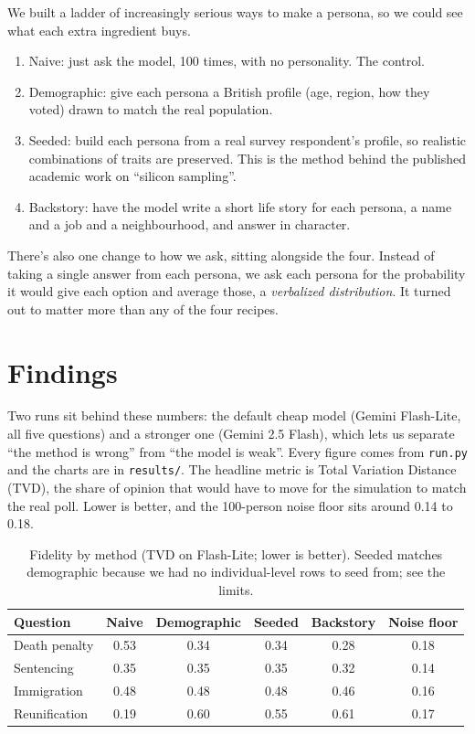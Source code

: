 \documentclass[11pt]{article}
\begin{document}
We built a ladder of increasingly serious ways to make a persona, so we could see
what each extra ingredient buys.
\begin{enumerate}
  \item Naive: just ask the model, 100 times, with no personality. The control.
  \item Demographic: give each persona a British profile (age, region, how they voted) drawn to match the real population.
  \item Seeded: build each persona from a real survey respondent's profile, so realistic combinations of traits are preserved. This is the method behind the published academic work on ``silicon sampling''.
  \item Backstory: have the model write a short life story for each persona, a name and a job and a neighbourhood, and answer in character.
\end{enumerate}

There's also one change to how we ask, sitting alongside the four. Instead of taking
a single answer from each persona, we ask each persona for the probability it would
give each option and average those, a \emph{verbalized distribution}. It turned out
to matter more than any of the four recipes.

\section*{Findings}

Two runs sit behind these numbers: the default cheap model (Gemini Flash-Lite, all
five questions) and a stronger one (Gemini 2.5 Flash), which lets us separate ``the
method is wrong'' from ``the model is weak''. Every figure comes from \texttt{run.py}
and the charts are in \texttt{results/}. The headline metric is Total Variation
Distance (TVD), the share of opinion that would have to move for the simulation to
match the real poll. Lower is better, and the 100-person noise floor sits around
0.14 to 0.18.

\begin{table}[H]
\centering
\begin{tabular}{lccccc}
\toprule
Question & Naive & Demographic & Seeded & Backstory & Noise floor \\
\midrule
Death penalty & 0.53 & 0.34 & 0.34 & 0.28 & 0.18 \\
Sentencing    & 0.35 & 0.35 & 0.35 & 0.32 & 0.14 \\
Immigration   & 0.48 & 0.48 & 0.48 & 0.46 & 0.16 \\
Reunification & 0.19 & 0.60 & 0.55 & 0.61 & 0.17 \\
\bottomrule
\end{tabular}
\caption{Fidelity by method (TVD on Flash-Lite; lower is better). Seeded matches
demographic because we had no individual-level rows to seed from; see the limits.}
\end{table}
\end{document}
